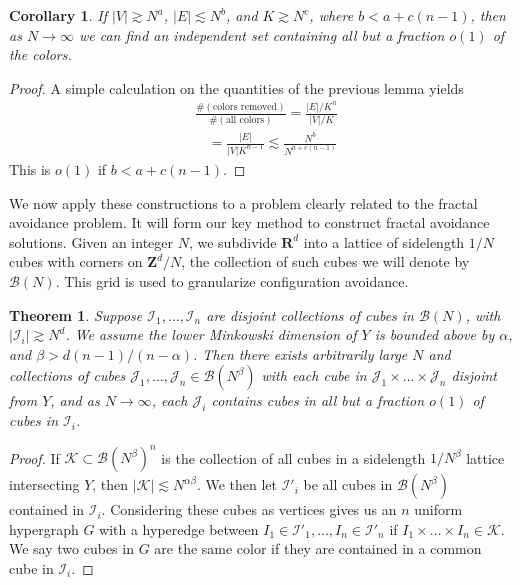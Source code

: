 \documentclass{article}
\theoremstyle{plain}
\newtheorem*{corollary}{Corollary}
\theoremstyle{plain}
\newtheorem{theorem}{Theorem}
\begin{document}
\begin{multicols}{2}
\begin{corollary}
	If $|V| \gtrsim N^a$, $|E| \lesssim N^b$, and $K \gtrsim N^c$, where $b < a + c(n-1)$, then as $N \to \infty$ we can find an independent set containing all but a fraction $o(1)$ of the colors.
\end{corollary}
\begin{proof}
	A simple calculation on the quantities of the previous lemma yields
	\begin{align*}
		&\frac{\# ( \text{colors removed} )}{\# ( \text{all colors} )} = \frac{|E|/K^n}{|V|/K}\\
		&\ \ \ \ = \frac{|E|}{|V|K^{n-1}} \lesssim \frac{N^b}{N^{a + c(n-1)}}
	\end{align*}
	This is $o(1)$ if $b < a + c(n-1)$.
\end{proof}

We now apply these constructions to a problem clearly related to the fractal avoidance problem. It will form our key method to construct fractal avoidance solutions. Given an integer $N$, we subdivide $\mathbf{R}^d$ into a lattice of sidelength $1/N$ cubes with corners on $\mathbf{Z}^d/N$, the collection of such cubes we will denote by $\mathcal{B}(N)$. This grid is used to granularize configuration avoidance.

\begin{theorem}
	Suppose $\mathcal{I}_1, \dots, \mathcal{I}_n$ are disjoint collections of cubes in $\mathcal{B}(N)$, with $|\mathcal{I}_i| \gtrsim N^d$. We assume the lower Minkowski dimension of $Y$ is bounded above by $\alpha$, and $\beta > d(n-1)/(n-\alpha)$. Then there exists arbitrarily large $N$ and collections of cubes $\mathcal{J}_1, \dots, \mathcal{J}_n \in \mathcal{B}(N^\beta)$ with each cube in $\mathcal{J}_1 \times \dots \times \mathcal{J}_n$ disjoint from $Y$, and as $N \to \infty$, each $\mathcal{J}_i$ contains cubes in all but a fraction $o(1)$ of cubes in $\mathcal{I}_i$.
\end{theorem}
\begin{proof}
	If $\mathcal{K} \subset \mathcal{B}(N^\beta)^n$ is the collection of all cubes in a sidelength $1/N^\beta$ lattice intersecting $Y$, then $|\mathcal{K}| \lesssim N^{\alpha \beta}$. We then let $\mathcal{I}'_i$ be all cubes in $\mathcal{B}(N^\beta)$ contained in $\mathcal{I}_i$. Considering these cubes as vertices gives us an $n$ uniform hypergraph $G$ with a hyperedge between $I_1 \in \mathcal{I}'_1, \dots, I_n \in \mathcal{I}'_n$ if $I_1 \times \dots \times I_n \in \mathcal{K}$. We say two cubes in $G$ are the same color if they are contained in a common cube in $\mathcal{I}_i$.


\end{proof}
\end{multicols}
\end{document}
